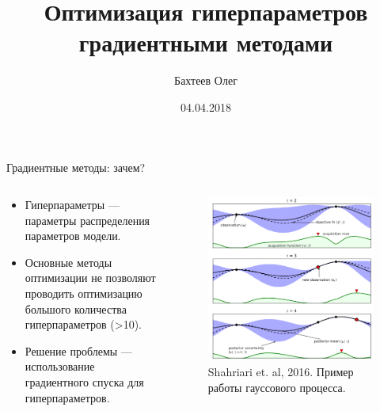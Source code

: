 \documentclass[10pt,pdf,utf8,russian,aspectratio=169]{beamer}
\title[Оптимизация гиперпараметров]{Оптимизация гиперпараметров градиентными методами}
\author{Бахтеев Олег}
\institute{МФТИ}
\date{04.04.2018}
\begin{document}
\begin{frame}
  \titlepage
\end{frame}



\begin{frame}{Градиентные методы: зачем?}
\begin{columns}
\begin{column}{0.5\textwidth}
\begin{itemize}
\item Гиперпараметры --- параметры распределения параметров модели.
\item Основные методы оптимизации не позволяют проводить оптимизацию большого количества гиперпараметров (>10).
\item Решение проблемы --- использование градиентного спуска для гиперпараметров.
\end{itemize}
\end{column}
\begin{column}{0.4\textwidth}
\begin{figure}[h]
\includegraphics[width=\textwidth]{./gp.png}
\caption*{Shahriari et. al, 2016. Пример работы гауссового процесса.}
\end{figure}

\end{column}
\end{columns}

\end{frame}
\end{document}
